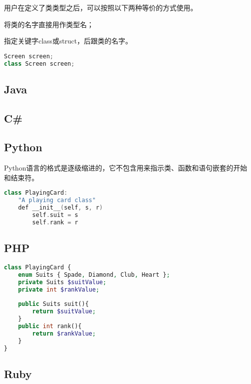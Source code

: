 用户在定义了类类型之后，可以按照以下两种等价的方式使用。

\begin{compactitem}
\item 将类的名字直接用作类型名；
\item 指定关键字class或struct，后跟类的名字。
\end{compactitem}

\begin{lstlisting}[language=C++]
Screen screen;
class Screen screen;
\end{lstlisting}



\subsection{Java}



\subsection{C\#}


\subsection{Python}


Python语言的格式是逐级缩进的，它不包含用来指示类、函数和语句嵌套的开始和结束符。


\begin{lstlisting}[language=C++]
class PlayingCard:
	"A playing card class"
	def __init__(self, s, r)
		self.suit = s
		self.rank = r
\end{lstlisting}


\subsection{PHP}




\begin{lstlisting}[language=PHP]
class PlayingCard {
	enum Suits { Spade, Diamond, Club, Heart };
	private Suits $suitValue;
	private int $rankValue;
	
	public Suits suit(){
		return $suitValue;
	}
	public int rank(){
		return $rankValue;
	}
}
\end{lstlisting}



\subsection{Ruby}



